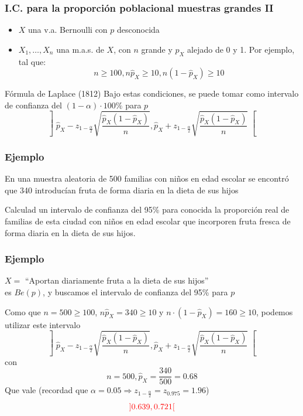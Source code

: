 \documentclass[12pt,t]{beamer}
\newcommand{\red}[1]{\textcolor{red}{#1}}
\renewcommand{\geq}{\geqslant}
\theoremstyle{plain}
\theoremstyle{definition}
\begin{document}
\begin{frame}[fragile]
\frametitle{I.C. para la proporción poblacional muestras grandes II}

\begin{itemize}
\item  $X$ una v.a. Bernoulli con $p$ desconocida
\item $X_1,\ldots,X_n$ una m.a.s. de $X$, con $n$  grande y $\widehat{p}_{X}$ alejado  de 0 y 1. Por ejemplo, tal que:
$$
n\geq 100, n\widehat{p}_{X}\geq 10,  n(1-\widehat{p}_{X})\geq 10
$$
\end{itemize}
\medskip

\begin{block}{Fórmula de Laplace (1812)}
Bajo  estas  condiciones, se puede tomar como intervalo de  confianza  del $(1-\alpha)\cdot 100\%$ para $p$
$$
\left]\widehat{p}_{X}-z_{1-\frac{\alpha}{2}}\sqrt{\frac{\widehat{p}_{X}
(1-\widehat{p}_{X})}{n}},
\widehat{p}_{X}+z_{1-\frac{\alpha}{2}}\sqrt{\frac{\widehat{p}_{X}
(1-\widehat{p}_{X})}{n}}\right[$$
\end{block}
\end{frame}



\begin{frame}
\frametitle{Ejemplo}

En una muestra aleatoria de 500 familias con niños en edad escolar se encontró que 
340 introducían fruta de forma diaria en la dieta de sus hijos
\medskip

Calculad un intervalo de confianza  del 95\% para  conocida la proporción real de
familias de esta ciudad con niños en edad escolar que incorporen fruta fresca de
forma diaria en la dieta de sus hijos.


\end{frame}
\begin{frame}
\frametitle{Ejemplo}

$X=$ ``Aportan diariamente fruta a la dieta de sus hijos''\\
 es $Be(p)$, y buscamos el  intervalo de confianza  del 95\%  para $p$ 
\bigskip

Como que $n=500\geq 100$, $n\widehat{p}_X=340\geq 10$ y $n\cdot (1-\widehat{p}_X)=160\geq 10$, podemos utilizar  este intervalo
$$
\left]\widehat{p}_{X}-z_{1-\frac{\alpha}{2}}\sqrt{\frac{\widehat{p}_{X}
(1-\widehat{p}_{X})}{n}},
\widehat{p}_{X}+z_{1-\frac{\alpha}{2}}\sqrt{\frac{\widehat{p}_{X}
(1-\widehat{p}_{X})}{n}}\right[
$$
con
$$
n=500, \widehat{p}_{X}=\dfrac{340}{500}=0.68
$$
Que vale (recordad que  {\small $\alpha=0.05\Rightarrow z_{1-\frac{\alpha}{2}}=z_{0.975}=1.96$})
$$
\red{]0.639,0.721[}
$$

\end{frame}
\end{document}
